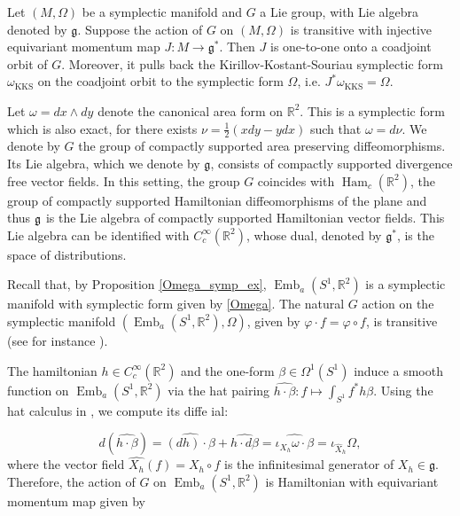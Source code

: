 \documentclass[11pt]{article}
\newcommand\on{\operatorname}
\newcommand\Emb{\on{Emb}}
\newcommand\Ham{\on{Ham}}
\newcommand\RR{\mathbb R}
\begin{document}
\begin{proposition}\label{folklore}
Let $(M, \Omega)$ be a symplectic manifold and $G$ a Lie group, with Lie algebra denoted by $\mathfrak g$. Suppose the action of $G$ on $(M, \Omega)$ is transitive with injective equivariant momentum map $J: M \to \mathfrak g^*$. Then $J$ is one-to-one onto a coadjoint orbit of $G$. Moreover, it pulls back the Kirillov-Kostant-Souriau symplectic form $\omega_{\text{KKS}}$ on the coadjoint orbit to the symplectic form $\Omega$, i.e. $J^*\omega_{\text{KKS}} = \Omega$. 
\end{proposition}


Let $\omega = dx\wedge dy$ denote the canonical area form on $\RR^2$. This is a symplectic form which is also exact, for there exists $\nu = \frac{1}{2}(xdy - ydx)$ such that $\omega = d\nu$. We denote by $G$ the group of compactly supported area preserving diffeomorphisms. Its Lie algebra, which we denote by $\mathfrak g$, consists of compactly supported divergence free vector fields. In this setting, the group $G$ coincides with $\Ham_c(\RR^2)$, the group of compactly supported Hamiltonian diffeomorphisms of the plane and thus $\frak g$ is the Lie algebra of compactly supported Hamiltonian vector fields. This Lie algebra can be identified with $C_c^\infty(\RR^2)$, whose dual, denoted by $\mathfrak g^*$, is the space of distributions. 


Recall that, by Proposition \ref{Omega_symp_ex}, $\Emb_a(S^1, \RR^2)$ is a symplectic manifold with symplectic form given by \eqref{Omega}.
The natural $G$ action on the symplectic manifold $(\Emb_a(S^1, \RR^2), \Omega)$, given by $\varphi \cdot f = \varphi \circ f$, is transitive (see for instance \cite{HV_weighted}). 

The hamiltonian $h \in C_c^\infty(\RR^2)$ and the one-form $\beta \in \Omega^1(S^1)$ induce a smooth function on $\Emb_a(S^1, \RR^2)$ via the hat pairing $\widehat{h \cdot \beta} : f \mapsto \int_{S^1}f^*h\beta$. Using the hat calculus in \cite{V}, we compute its diffe
ial: 

\begin{equation*}
d(\widehat{h \cdot \beta}) =  \widehat{(dh)\cdot\beta} + \widehat{h\cdot d\beta} = \widehat{\iota_{X_h}\omega\cdot\beta} = \iota_{\hat{X}_h}\Omega, 
\end{equation*}
where the vector field $\hat{X_h}(f) = X_h \circ f$ is the infinitesimal generator of $X_h \in \mathfrak g$. Therefore, the action of $G$ on $\Emb_a(S^1, \RR^2)$ is Hamiltonian with equivariant momentum map given by
\end{document}
